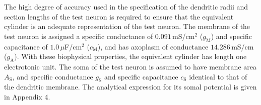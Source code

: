 
The high degree of accuracy used in the specification of the
dendritic radii and section lengths of the test neuron is required
to ensure that the equivalent cylinder is an adequate
representation of the test neuron. The membrane of the test neuron
is assigned a specific conductance of $0.091\,$mS/cm$^2$
($g_\mathrm{M}$) and specific capacitance of $1.0\,\mu$F/cm$^2$
($c_\mathrm{M}$), and has axoplasm of conductance $14.286\,$mS/cm
($g_\mathrm{A}$). With these biophysical properties, the
equivalent cylinder has length one electrotonic unit. The soma of
the test neuron is assumed to have membrane area $A_\mathrm{S}$,
and specific conductance $g_\mathrm{S}$ and specific capacitance
$c_\mathrm{S}$ identical to that of the dendritic membrane. The
analytical expression for its somal potential is given in Appendix
4.
